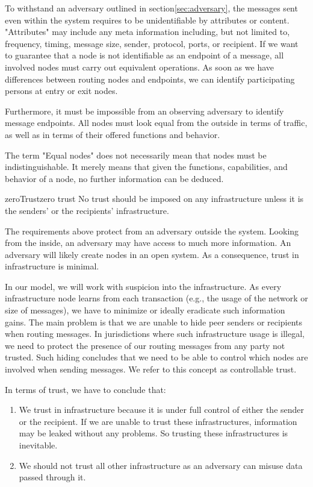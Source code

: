 To withstand an adversary outlined in section\ref{sec:adversary}, the messages sent even within the system requires to be unidentifiable by attributes or content. "Attributes" may include any meta information including, but not limited to, frequency, timing, message size, sender, protocol, ports, or recipient. If we want to guarantee that a node is not identifiable as an endpoint of a message, all involved nodes must carry out equivalent operations. As soon as we have differences between routing nodes and endpoints, we can identify participating persons at entry or exit nodes.

Furthermore, it must be impossible from an observing adversary to identify message endpoints. All nodes must look equal from the outside in terms of traffic, as well as in terms of their offered functions and behavior. 

The term "Equal nodes" does not necessarily mean that nodes must be indistinguishable. It merely means that given the functions, capabilities, and behavior of a node, no further information can be deduced.

\begin{requirement}{zeroTrust}{zero trust}
	No trust should be imposed on any infrastructure unless it is the senders' or the recipients' infrastructure.
\end{requirement}    

The requirements above protect from an adversary outside the system. Looking from the inside, an adversary may have access to much more information. An adversary will likely create nodes in an open system. As a consequence, trust in infrastructure is minimal.

In our model, we will work with suspicion into the infrastructure. As every infrastructure node learns from each transaction (e.g., the usage of the network or size of messages), we have to minimize or ideally eradicate such information gains. The main problem is that we are unable to hide peer senders or recipients when routing messages. In jurisdictions where such infrastructure usage is illegal, we need to protect the presence of our routing messages from any party not trusted. Such hiding concludes that we need to be able to control which nodes are involved when sending messages. We refer to this concept as controllable trust.

In terms of trust, we have to conclude that:
\begin{enumerate}
	\item We trust in infrastructure because it is under full control of either the sender or the recipient. If we are unable to trust these infrastructures, information may be leaked without any problems. So trusting these infrastructures is inevitable.
	\item We should not trust all other infrastructure as an adversary can misuse data passed through it.
\end{enumerate}

